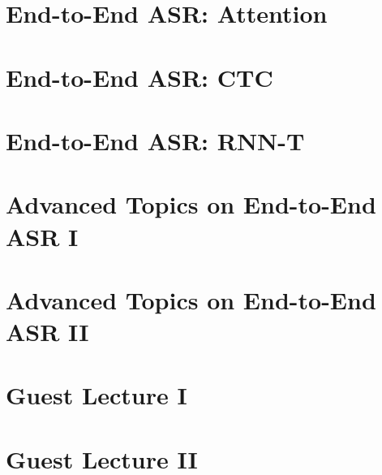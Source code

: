 \documentclass[a4paper]{article}
\begin{document}
\section{End-to-End ASR: Attention}


\section{End-to-End ASR: CTC}


\section{End-to-End ASR: RNN-T}


\section{Advanced Topics on End-to-End ASR I}


\section{Advanced Topics on End-to-End ASR II}


\section{Guest Lecture I}


\section{Guest Lecture II}

\end{document}
